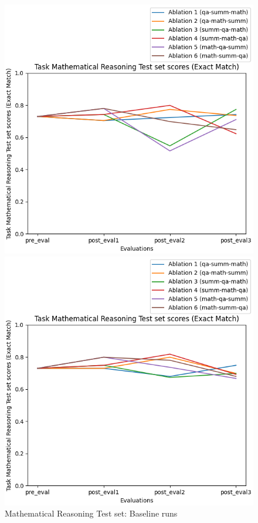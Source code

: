 \begin{figure}[H]
    \centering
    \begin{minipage}{0.45\textwidth}
        \centering
        \includegraphics[width=1.1\textwidth]{Figures/results/trace_baseline_graphs/task_eval/math_test_Test_baseline.png} %
        \captionsetup{width=1.1\textwidth}
        \caption{Mathematical Reasoning Test set: Baseline runs}
        \label{MathAblationBaseline}
    \end{minipage}\hfill
    \begin{minipage}{0.45\textwidth}
        \centering
        \includegraphics[width=1.1\textwidth]{Figures/results/trace_mitigation_graphs/task_eval/math_test_Test_mitigation.png} %

\end{minipage}
\end{figure}

